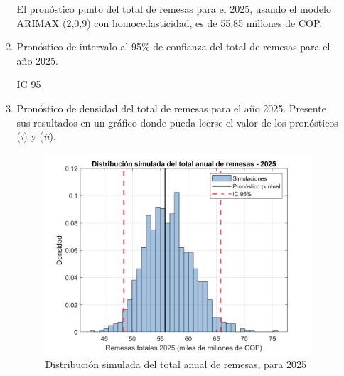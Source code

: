 \documentclass{article}
\theoremstyle{remark}
\theoremstyle{definition}
\begin{document}
\begin{enumerate}[label=\emph{\alph*})]
\begin{enumerate}[label=(\emph{\roman*})]
\begin{tcolorbox}[title=Soluci\'on 3.i.i]
        El pronóstico punto del total de remesas para el 2025, usando el modelo ARIMAX (2,0,9) con homocedasticidad, es de 55.85 millones de COP. 
            \end{tcolorbox}
        \item {Pron\'ostico de intervalo al 95\% de confianza del total de remesas para el año 2025.}
            \begin{tcolorbox}[title=Soluci\'on 3.i.ii]

IC 95%
            
            \end{tcolorbox}
        \item {Pron\'ostico de densidad del total de remesas para el año 2025. Presente sus resultados en un gr\'afico donde pueda leerse el valor de los pron\'osticos (\emph{i}) y (\emph{ii}).}
            \begin{tcolorbox}[title=Soluci\'on 3.i.iii]

       \begin{figure}[H]
                \centering
                \includegraphics[width=0.5\linewidth]{docs/Densidad_final.png}
                \caption{Distribución simulada del total anual de remesas, para 2025}
                \label{fig:enter-label}
            \end{figure}
            
            \end{tcolorbox}
    \end{enumerate}
\end{enumerate}

\nocite{*}

\printbibliography
\end{document}
